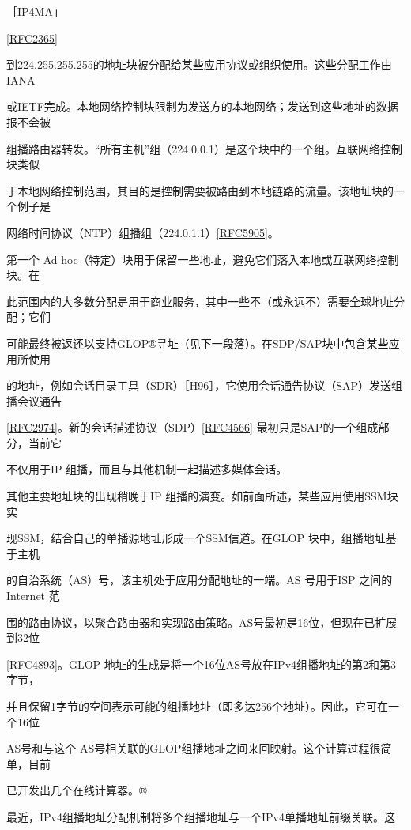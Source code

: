 ［IP4MA」

\href{https://www.rfc-editor.org/rfc/rfc2365}{[RFC2365]}

到224.255.255.255的地址块被分配给某些应用协议或组织使用。这些分配工作由IANA

或IETF完成。本地网络控制块限制为发送方的本地网络；发送到这些地址的数据报不会被

组播路由器转发。“所有主机”组（224.0.0.1）是这个块中的一个组。互联网络控制块类似

于本地网络控制范围，其目的是控制需要被路由到本地链路的流量。该地址块的一个例子是

网络时间协议（NTP）组播组（224.0.1.1）\href{https://www.rfc-editor.org/rfc/rfc5905}{[RFC5905]}。

第一个 Ad hoc（特定）块用于保留一些地址，避免它们落入本地或互联网络控制块。在

此范围内的大多数分配是用于商业服务，其中一些不（或永远不）需要全球地址分配；它们

可能最终被返还以支持GLOP®寻址（见下一段落）。在SDP/SAP块中包含某些应用所使用

的地址，例如会话目录工具（SDR）［H96］，它使用会话通告协议（SAP）发送组播会议通告

\href{https://www.rfc-editor.org/rfc/rfc2974}{[RFC2974]}。新的会话描述协议（SDP）\href{https://www.rfc-editor.org/rfc/rfc4566}{[RFC4566]} 最初只是SAP的一个组成部分，当前它

不仅用于IP 组播，而且与其他机制一起描述多媒体会话。

其他主要地址块的出现稍晚于IP 组播的演变。如前面所述，某些应用使用SSM块实

现SSM，结合自己的单播源地址形成一个SSM信道。在GLOP 块中，组播地址基于主机

的自治系统（AS）号，该主机处于应用分配地址的一端。AS 号用于ISP 之间的 Internet 范

围的路由协议，以聚合路由器和实现路由策略。AS号最初是16位，但现在已扩展到32位

\href{https://www.rfc-editor.org/rfc/rfc4893}{[RFC4893]}。GLOP 地址的生成是将一个16位AS号放在IPv4组播地址的第2和第3字节，

并且保留1字节的空间表示可能的组播地址（即多达256个地址）。因此，它可在一个16位

AS号和与这个 AS号相关联的GLOP组播地址之间来回映射。这个计算过程很简单，目前

已开发出几个在线计算器。®

最近，IPv4组播地址分配机制将多个组播地址与一个IPv4单播地址前缀关联。这

